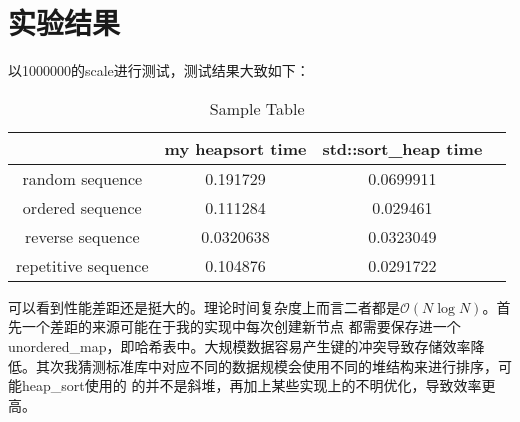 \documentclass[UTF8]{ctexart}
\begin{document}
\section{实验结果}

\par 以1000000的scale进行测试，测试结果大致如下：
\begin{table}[ht]
    \centering
    \begin{tabular}{|c|c|c|c|}
    \hline
    \textbf{}  & \textbf{my heapsort time} & \textbf{std::sort\_heap time}   \\ \hline
    random sequence     & 0.191729         & 0.0699911           \\ \hline
    ordered sequence    & 0.111284         & 0.029461            \\ \hline
    reverse sequence    & 0.0320638        & 0.0323049           \\ \hline
    repetitive sequence & 0.104876         & 0.0291722           \\ \hline
    \end{tabular}
    \caption{Sample Table}
\end{table}
\par 可以看到性能差距还是挺大的。理论时间复杂度上而言二者都是$\mathcal{O}(N \log N)$。首先一个差距的来源可能在于我的实现中每次创建新节点
都需要保存进一个unordered\_map，即哈希表中。大规模数据容易产生键的冲突导致存储效率降低。其次我猜测标准库中对应不同的数据规模会使用不同的堆结构来进行排序，可能heap\_sort使用的
的并不是斜堆，再加上某些实现上的不明优化，导致效率更高。
\end{document}
